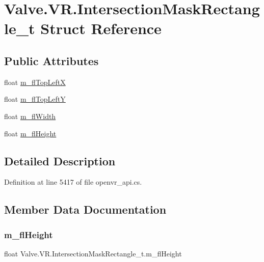\hypertarget{struct_valve_1_1_v_r_1_1_intersection_mask_rectangle__t}{}\section{Valve.\+V\+R.\+Intersection\+Mask\+Rectangle\+\_\+t Struct Reference}
\label{struct_valve_1_1_v_r_1_1_intersection_mask_rectangle__t}
\subsection*{Public Attributes}
\begin{DoxyCompactItemize}
\item 
float \mbox{\hyperlink{struct_valve_1_1_v_r_1_1_intersection_mask_rectangle__t_a3762a0bf16baf6a61134d090a66e5ac2}{m\+\_\+fl\+Top\+LeftX}}
\item 
float \mbox{\hyperlink{struct_valve_1_1_v_r_1_1_intersection_mask_rectangle__t_acf47e1364afcffe93ea08d1d71d7df6b}{m\+\_\+fl\+Top\+LeftY}}
\item 
float \mbox{\hyperlink{struct_valve_1_1_v_r_1_1_intersection_mask_rectangle__t_adfcf9274b058d791e08f4f5bbfd16310}{m\+\_\+fl\+Width}}
\item 
float \mbox{\hyperlink{struct_valve_1_1_v_r_1_1_intersection_mask_rectangle__t_a36834bc91ef0346bcb5e472d0779baed}{m\+\_\+fl\+Height}}
\end{DoxyCompactItemize}


\subsection{Detailed Description}


Definition at line 5417 of file openvr\+\_\+api.\+cs.



\subsection{Member Data Documentation}
\mbox{\label{struct_valve_1_1_v_r_1_1_intersection_mask_rectangle__t_a36834bc91ef0346bcb5e472d0779baed}} 
\subsubsection{\texorpdfstring{m\_flHeight}{m\_flHeight}}
{\footnotesize\ttfamily float Valve.\+V\+R.\+Intersection\+Mask\+Rectangle\+\_\+t.\+m\+\_\+fl\+Height}



